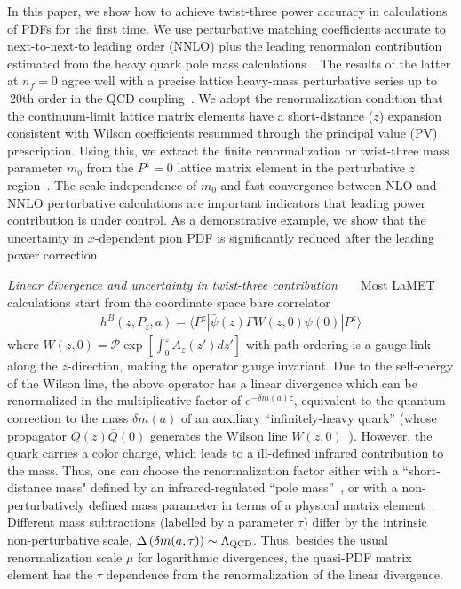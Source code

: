 \documentclass[prd,aps,nofootinbib,superscriptaddress,floatfix,preprintnumbers,twocolumn]{revtex4}
\begin{document}
In this paper, we show how to achieve twist-three power accuracy in calculations of PDFs for the first time. We use perturbative matching coefficients accurate to next-to-next-to leading order (NNLO) plus the leading renormalon contribution estimated from the heavy quark pole mass calculations~\cite{Pineda:2001zq,Ayala:2014yxa}. The results of the latter at $n_f=0$ agree well with a precise lattice heavy-mass perturbative series up to $~20$th order in the QCD coupling~\cite{Bali:2013pla}. We adopt the renormalization condition that the continuum-limit lattice matrix elements have a short-distance ($z$) expansion consistent with Wilson coefficients resummed through the principal value (PV) prescription. Using this, we extract the finite renormalization or twist-three mass parameter $m_0$ from the $P^z=0$ lattice matrix element in the perturbative $z$ region~\cite{LatticePartonCollaborationLPC:2021xdx}. The scale-independence of $m_0$ and fast convergence between NLO and NNLO perturbative calculations are important indicators that leading power contribution is under control. As a demonstrative example, we show that the uncertainty in $x$-dependent pion PDF is significantly reduced after the leading power correction. 

\vskip 0.2cm
{\it Linear divergence and uncertainty in twist-three contribution~~~} Most LaMET calculations start from the coordinate space bare correlator~\cite{Ji:2013dva}
\begin{align}
    h^B(z,P_z,a) = \langle P^z |\bar{\psi}(z)\Gamma W(z,0)\psi(0)|P^z\rangle
\end{align}
where $W(z,0)=\mathcal{P}\exp[\int_0^zA_z(z')dz']$ with path ordering is a gauge link along the $z$-direction, making the operator gauge invariant. Due to the self-energy of the Wilson line, the above operator has a linear divergence which can be renormalized in the multiplicative factor of $e^{-\delta m(a)z}$, equivalent to the quantum correction to the mass $\delta m(a)$ of an auxiliary ``infinitely-heavy quark'' (whose propagator $Q(z)\bar{Q}(0)$ generates the Wilson line $W(z,0)$~\cite{Chen:2016fxx,Green:2017xeu,Ji:2017oey,Ishikawa:2017faj,Ji:2020brr}). However, the quark carries a color charge, which leads to a ill-defined infrared contribution to the mass. Thus, one can choose the renormalization factor either with a ``short-distance mass" defined by an infrared-regulated ``pole mass''~\cite{Bali:2013pla}, or with a non-perturbatively defined mass parameter in terms of a physical matrix element~\cite{Zhang:2017bzy,LatticePartonCollaborationLPC:2021xdx,Gao:2021dbh}.  Different mass subtractions (labelled by a parameter $\tau$) differ by the intrinsic non-perturbative scale, $\Delta \left(\delta m(a,\tau)\right)\sim \Lambda_{\rm QCD}$. Thus, besides the usual renormalization scale $\mu$ for logarithmic divergences, 
the quasi-PDF matrix element has the $\tau$ dependence from the renormalization of the linear divergence.
\end{document}
